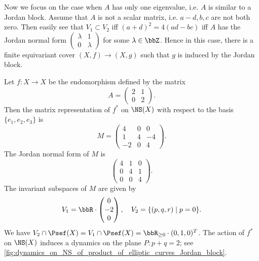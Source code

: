     Now we focus on the case when \(A\) has only one eigenvalue, i.e. \(A\) is similar to a Jordan block.
    Assume that \(A\) is not a scalar matrix, i.e. \(a-d,b,c\) are not both zero.
    Then easily see that \(V_1 \subset V_2\) iff \((a+d)^2 = 4(ad-bc)\) iff \(A\) has the Jordan normal form \(\begin{pmatrix}
        \lambda & 1 \\
        0 & \lambda
    \end{pmatrix}\) for some \(\lambda \in \bbZ\).
    Hence in this case, there is a finite equivariant cover \((X,f) \to (X,g)\) such that \(g\) is induced by the Jordan block.

    \begin{example}\label{eg:Jordan_block_acts_on_NS_by_endomorphism_of_product_of_elliptic_curves:abelian-varieties}
        Let \(f: X \to X\) be the endomorphism defined by the matrix
        \[ A = \begin{pmatrix}
            2 & 1 \\
            0 & 2
        \end{pmatrix}. \]
        Then the matrix representation of \(f^*\) on \(\NS(X)\) with respect to the basis \(\{e_1, e_2, e_3\}\) is
        \[
            M = \begin{pmatrix}
                4 & 0 & 0 \\
                1 & 4 & -4 \\
                -2 & 0 & 4
            \end{pmatrix}.
        \]
        The Jordan normal form of \(M\) is
        \[
            \begin{pmatrix}
                4 & 1 & 0 \\
                0 & 4 & 1 \\
                0 & 0 & 4
            \end{pmatrix}.
        \]
        The invariant subspaces of \(M\) are given by
        \[ V_1 = \bbR \cdot \begin{pmatrix}
            0 \\
            -2 \\
            0
        \end{pmatrix}, \quad V_2 = \{(p,q,r) \mid p = 0\}. \]
        We have \(V_2 \cap \Psef(X) = V_1 \cap \Psef(X) = \bbR_{\geq 0} \cdot (0,1,0)^T\).
        The action of \(f^*\) on \(\NS(X)\) induces a dynamics on the plane \(P: p+q=2\); see \cref{fig:dynamics_on_NS_of_product_of_elliptic_curves_Jordan_block}.
    \end{example}






